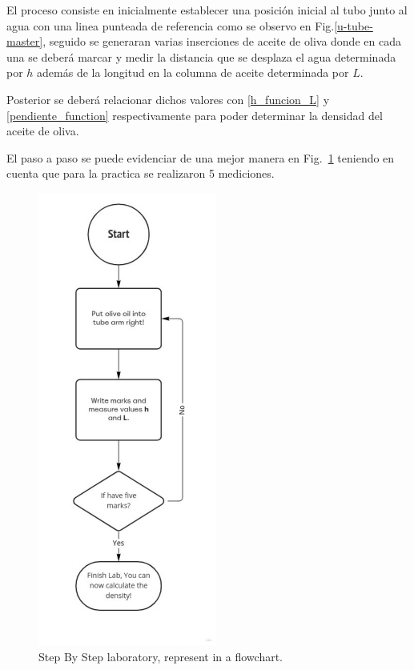 El proceso consiste en inicialmente establecer una posición inicial al tubo junto al agua con una linea punteada de referencia como se observo en Fig.\ref{u-tube-master}, seguido se generaran varias inserciones de aceite de oliva donde en cada una se deberá marcar y medir la distancia que se desplaza el agua determinada por $h$ además de la longitud en la columna de aceite determinada por $L$.  

Posterior se deberá relacionar dichos valores con \ref{h_funcion_L} y \ref{pendiente_function} respectivamente para poder determinar la densidad del aceite de oliva.

El paso a paso se puede evidenciar de una mejor manera en Fig.~\ref{step-by-step-lab} teniendo en cuenta que para la practica se realizaron 5 mediciones.

\begin{figure}[htbp]
  \begin{center}
  \includegraphics[width=2.3in]{pdf/step_by_step_lab_v2.pdf}
  \caption{Step By Step laboratory, represent in a flowchart.}\label{step-by-step-lab}
  \end{center}
\end{figure}



